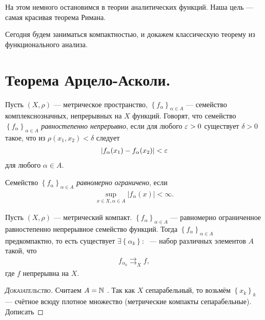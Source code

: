 \documentclass[../complex-analysis.tex]{subfiles}
\begin{document}
 На этом немного остановимся в теории аналитических функций. Наша цель --- самая красивая теорема Римана.

 Сегодня будем заниматься компактностью, и докажем классическую теорему из функционального анализа.

 \newpage
 \section{Теорема Арцело-Асколи.}

 \begin{df}
  Пусть $ (X,\rho) $ --- метрическое пространство, $ \left\{f_\alpha\right\}_{\alpha \in A}  $ --- семейство комплекснозначных, непрерывных на $ X $ функций. Говорят, что семейство $ \left\{f_\alpha\right\}_{\alpha\in A}  $ \textit{равностепенно непрерывно}, если для любого $ \varepsilon > 0 $ существует $ \delta > 0 $ такое, что из $ \rho(x_1, x_2) < \delta $ следует
  \begin{align*}
   \left|f_\alpha(x_1) - f_\alpha(x_2) \right| < \varepsilon
  \end{align*} для любого $ \alpha \in A $.
 \end{df}
 \begin{df}
  Семейство $ \left\{f_\alpha\right\}_{\alpha \in A}  $ \textit{равномерно ограничено}, если
  \begin{align*}
   \sup_{x \in X, \alpha \in A} \left| f_\alpha(x) \right| < \infty.
  \end{align*}
 \end{df}

 \begin{thm}
  Пусть $ (X,\rho) $ --- метрический компакт.  $ \left\{f_\alpha\right\}_{\alpha \in A}  $ --- равномерно ограниченное равностепенно непрерывное семейство функций. Тогда $ \left\{f_\alpha\right\}_{\alpha \in A} $ предкомпактно, то есть существует $ \exists \left\{\alpha_k\right\} \colon\;  $ --- набор различных элементов $ A $ такой, что
  \begin{align*}
   f_{\alpha_k} \rightrightarrows_X f,
  \end{align*} где $ f $ непрерывна на $ X $.
 \end{thm}
 \begin{proof}[\normalfont\textsc{Доказательство}]
  Считаем $ A = \mathbb{N} $ . Так как $ X $  сепарабельный, то возьмём $ \left\{x_k\right\}_{k}  $ --- счётное всюду плотное множество (метрические компакты сепарабельные). {\color{red} Дописать}
 \end{proof}
\end{document}
